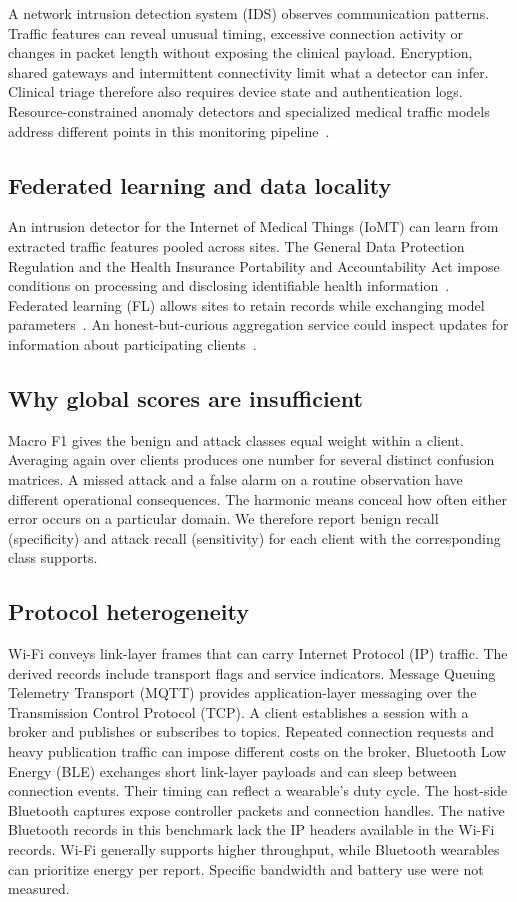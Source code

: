 \documentclass[nolineno]{ieeeaccess}
\begin{document}
A network intrusion detection system (IDS) observes communication patterns. Traffic features can reveal unusual timing, excessive connection activity or changes in packet length without exposing the clinical payload. Encryption, shared gateways and intermittent connectivity limit what a detector can infer. Clinical triage therefore also requires device state and authentication logs. Resource-constrained anomaly detectors and specialized medical traffic models address different points in this monitoring pipeline~\cite{edgeids,specialized}.

\subsection{Federated learning and data locality}
An intrusion detector for the Internet of Medical Things (IoMT) can learn from extracted traffic features pooled across sites. The General Data Protection Regulation and the Health Insurance Portability and Accountability Act impose conditions on processing and disclosing identifiable health information~\cite{gdpr,hipaa2013security}. Federated learning (FL) allows sites to retain records while exchanging model parameters~\cite{nguyen2021federated,mcmahan2017communication}. An honest-but-curious aggregation service could inspect updates for information about participating clients~\cite{leakage}.

\subsection{Why global scores are insufficient}
Macro F1 gives the benign and attack classes equal weight within a client. Averaging again over clients produces one number for several distinct confusion matrices. A missed attack and a false alarm on a routine observation have different operational consequences. The harmonic means conceal how often either error occurs on a particular domain. We therefore report benign recall (specificity) and attack recall (sensitivity) for each client with the corresponding class supports.

\subsection{Protocol heterogeneity}
Wi-Fi conveys link-layer frames that can carry Internet Protocol (IP) traffic. The derived records include transport flags and service indicators. Message Queuing Telemetry Transport (MQTT) provides application-layer messaging over the Transmission Control Protocol (TCP). A client establishes a session with a broker and publishes or subscribes to topics. Repeated connection requests and heavy publication traffic can impose different costs on the broker. Bluetooth Low Energy (BLE) exchanges short link-layer payloads and can sleep between connection events. Their timing can reflect a wearable's duty cycle. The host-side Bluetooth captures expose controller packets and connection handles. The native Bluetooth records in this benchmark lack the IP headers available in the Wi-Fi records. Wi-Fi generally supports higher throughput, while Bluetooth wearables can prioritize energy per report. Specific bandwidth and battery use were not measured.
\end{document}
